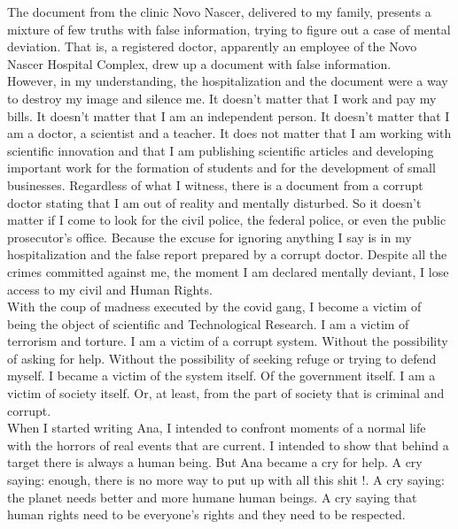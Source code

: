 \documentclass[11pt]{book}
\begin{document}
\noindent The document from the clinic Novo Nascer, delivered to my family, presents a mixture of few truths with false information, trying to figure out a case of mental deviation. That is, a registered doctor, apparently an employee of the Novo Nascer Hospital Complex, drew up a document with false information. \\

\noindent However, in my understanding, the hospitalization and the document were a way to destroy my image and silence me. It doesn't matter that I work and pay my bills. It doesn't matter that I am an independent person. It doesn't matter that I am a doctor, a scientist and a teacher. It does not matter that I am working with scientific innovation and that I am publishing scientific articles and developing important work for the formation of students and for the development of small businesses. Regardless of what I witness, there is a document from a corrupt doctor stating that I am out of reality and mentally disturbed. So it doesn't matter if I come to look for the civil police, the federal police, or even the public prosecutor's office. Because the excuse for ignoring anything I say is in my hospitalization and the false report prepared by a corrupt doctor. Despite all the crimes committed against me, the moment I am declared mentally deviant, I lose access to my civil and Human Rights. \\

\noindent With the coup of madness executed by the covid gang, I become a victim of being the object of scientific and Technological Research. I am a victim of terrorism and torture. I am a victim of a corrupt system. Without the possibility of asking for help. Without the possibility of seeking refuge or trying to defend myself. I became a victim of the system itself. Of the government itself. I am a victim of society itself. Or, at least, from the part of society that is criminal and corrupt. \\

\noindent When I started writing Ana, I intended to confront moments of a normal life with the horrors of real events that are current. I intended to show that behind a target there is always a human being. But Ana became a cry for help. A cry saying: enough, there is no more way to put up with all this shit !. A cry saying: the planet needs better and more humane human beings. A cry saying that human rights need to be everyone's rights and they need to be respected. \\
\end{document}
